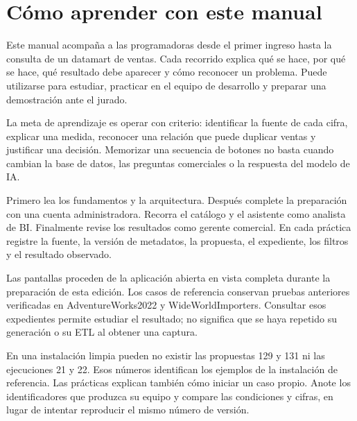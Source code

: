 \chapter{Cómo aprender con este manual}
Este manual acompaña a las programadoras desde el primer ingreso hasta la consulta de un datamart de ventas. Cada recorrido explica qué se hace, por qué se hace, qué resultado debe aparecer y cómo reconocer un problema. Puede utilizarse para estudiar, practicar en el equipo de desarrollo y preparar una demostración ante el jurado.

La meta de aprendizaje es operar con criterio: identificar la fuente de cada cifra, explicar una medida, reconocer una relación que puede duplicar ventas y justificar una decisión. Memorizar una secuencia de botones no basta cuando cambian la base de datos, las preguntas comerciales o la respuesta del modelo de IA.

Primero lea los fundamentos y la arquitectura. Después complete la preparación con una cuenta administradora. Recorra el catálogo y el asistente como analista de BI. Finalmente revise los resultados como gerente comercial. En cada práctica registre la fuente, la versión de metadatos, la propuesta, el expediente, los filtros y el resultado observado.

Las pantallas proceden de la aplicación abierta en vista completa durante la preparación de esta edición. Los casos de referencia conservan pruebas anteriores verificadas en AdventureWorks2022 y WideWorldImporters. Consultar esos expedientes permite estudiar el resultado; no significa que se haya repetido su generación o su ETL al obtener una captura.

En una instalación limpia pueden no existir las propuestas 129 y 131 ni las ejecuciones 21 y 22. Esos números identifican los ejemplos de la instalación de referencia. Las prácticas explican también cómo iniciar un caso propio. Anote los identificadores que produzca su equipo y compare las condiciones y cifras, en lugar de intentar reproducir el mismo número de versión.

